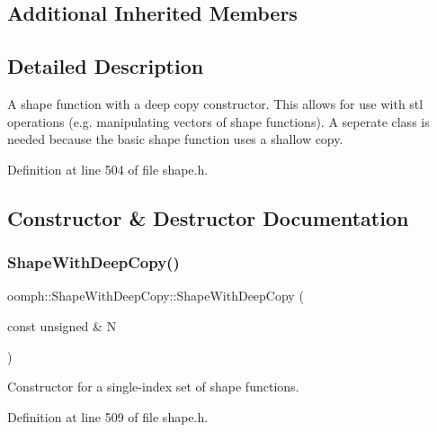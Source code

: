 \subsection*{Additional Inherited Members}


\subsection{Detailed Description}
A shape function with a deep copy constructor. This allows for use with stl operations (e.\+g. manipulating vectors of shape functions). A seperate class is needed because the basic shape function uses a shallow copy. 

Definition at line 504 of file shape.\+h.



\subsection{Constructor \& Destructor Documentation}
\mbox{\label{classoomph_1_1ShapeWithDeepCopy_a1499808202122f3b33c392e67deda9af}} 
\subsubsection{\texorpdfstring{Shape\+With\+Deep\+Copy()}{ShapeWithDeepCopy()}\hspace{0.1cm}{\footnotesize\ttfamily [1/4]}}
{\footnotesize\ttfamily oomph\+::\+Shape\+With\+Deep\+Copy\+::\+Shape\+With\+Deep\+Copy (\begin{DoxyParamCaption}\item[{const unsigned \&}]{N }\end{DoxyParamCaption})\hspace{0.3cm}{\ttfamily [inline]}}



Constructor for a single-\/index set of shape functions. 



Definition at line 509 of file shape.\+h.

\mbox{\label{classoomph_1_1ShapeWithDeepCopy_abf949c57278bc1971de05c23af752b12}} 
